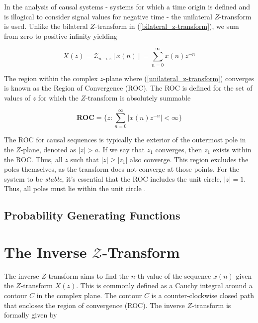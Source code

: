 \documentclass[a4paper]{report}
\begin{document}
In the analysis of causal systems - systems for which a time origin is defined and is illogical to consider signal values for negative time - the unilateral $Z$-transform is used. Unlike the bilateral $Z$-transform in (\ref{bilateral_z-transform}), we sum from zero to positive infinity yielding

\begin{equation}\label{unilateral_z-transform}
	X(z) = \mathcal{Z}_{n \rightarrow z}[x(n)] = \sum^{\infty}_{n = 0} x(n)z^{-n}
\end{equation}

The region within the complex $z$-plane where (\ref{unilateral_z-transform}) converges is known as the Region of Convergence (ROC). The ROC is defined for the set of values of $z$ for which the $Z$-transform is absolutely summable

\begin{equation}\label{roc}
	\textbf{ROC} = \Biggl\{ z : \sum^{\infty}_{n = 0} |x(n)z^{-n}| < \infty \Biggr\}
\end{equation}

The ROC for causal sequences is typically the exterior of the outermost pole in the $Z$-plane, denoted as $|z| > a$. If we say that $z_1$ converges, then $z_1$ exists within the ROC. Thus, all $z$ such that $|z| \geq |z_1|$ also converge. This region excludes the poles themselves, as the transform does not converge at those points. For the system to be \textit{stable}, it's essential that the ROC includes the unit circle, $|z| = 1$. Thus, all poles must lie within the unit circle \cite{LovelessGuido2021}.

\subsection{Probability Generating Functions}\label{pgfs}


\section{The Inverse \texorpdfstring{$\mathcal{Z}$}{Lg}-Transform}

The inverse $Z$-transform aims to find the $n$-th value of the sequence $x(n)$ given the $Z$-transform $X(z)$. This is commonly defined as a Cauchy integral around a contour $C$ in the complex plane. The contour $C$ is a counter-clockwise closed path that encloses the region of convergence (ROC). The inverse $Z$-transform is formally given by
\end{document}

